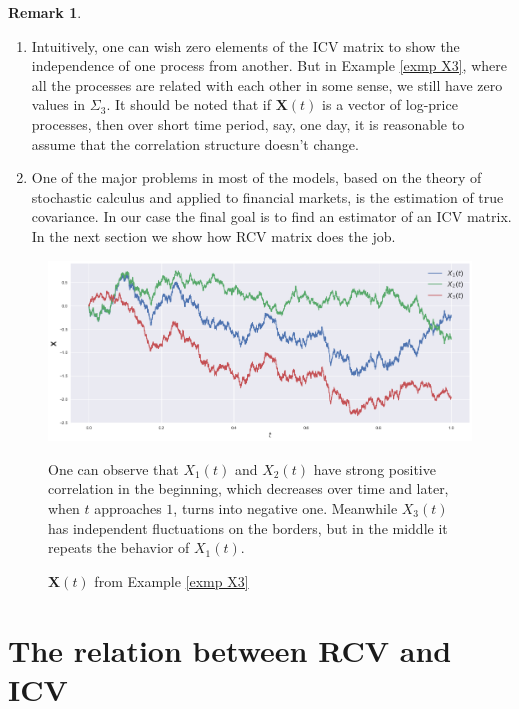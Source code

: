 \documentclass[a4paper,11pt]{article}
\theoremstyle{plain}
\theoremstyle{definition}
\newtheorem{rmrk}[thm]{Remark}
\begin{document}
	\begin{rmrk} \
		\begin{enumerate}
			\item 
			Intuitively, one can wish zero elements of the ICV matrix to show the independence of one process from another. But in Example \ref{exmp X3}, where all the processes are related with each other in some sense, we still have zero values in $\Sigma_3$. It should be noted that if $\mathbf{X}(t)$ is a vector of log-price processes, then over short time period, say, one day, it is reasonable to assume that the correlation structure doesn't change.
			\item One of the major problems in most of the models, based on the theory of stochastic calculus and applied to financial markets, is the estimation of true covariance. In our case the final goal is to find an estimator of an ICV matrix. In the next section we show how RCV matrix does the job.
		\end{enumerate}
	\end{rmrk}
	
	\begin{figure}
		\begin{center} \centering
			\includegraphics[scale=0.4]{X3}
			\caption{$\mathbf{X}(t)$ from Example \ref{exmp X3}}
			\smallskip
			\small
			One can observe that $X_1(t)$ and $X_2(t)$ have strong positive correlation in the beginning, which decreases over time and later, when $t$ approaches $1$, turns into negative one. Meanwhile $X_3(t)$ has independent fluctuations on the borders, but in the middle it repeats the behavior of $X_1(t)$.
		\end{center}
	\end{figure}
	
	\section*{The relation between RCV and ICV}
	
\end{document}
